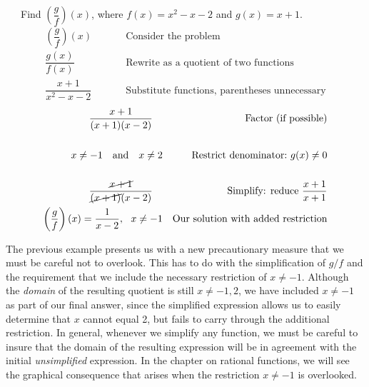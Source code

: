\begin{example}~~~Find $\left(\dfrac{g}{f}\right)(x)$, where $f(x) = x^2 - x - 2$ and $g(x) = x + 1$.
 \begin{eqnarray*}
    \left(\dfrac{g}{f}\right)(x)~~~~~~~~ &  & \text{Consider the problem} \\
		\dfrac{g(x)}{f(x)}~~~~~~~~~ &  & \text{Rewrite~as~a~quotient~of~two~functions}\\
    \dfrac{x + 1}{x^2 - x - 2}~~~~~  &  & \text{Substitute~functions,~parentheses~unnecessary}
\end{eqnarray*}
 \begin{eqnarray*}
  	 \dfrac{x+1}{(x+1)(x-2)}~~~&  & \text{Factor (if possible)}\\
  & & \\ 
		x \neq -1 ~~\text{~and~}~~ x \neq 2 &  & \text{Restrict~denominator:~}g(x)\neq 0\\
  & & \\ 
	\dfrac{\cancel{x + 1}}{\cancel{(x+1)}(x-2)}~~~  & & \text{Simplify: reduce $\dfrac{x+1}{x+1}$}\\
	\left(\dfrac{g}{f}\right)(x)=\dfrac{1}{x-2}, ~~ x \neq -1  & & \text{Our solution with added restriction}
	\end{eqnarray*}
\end{example}
		
The previous example presents us with a new precautionary measure that we must be careful not to overlook.  This has to do with the simplification of $g/f$ and the requirement that we include the necessary restriction of $x\neq -1$.  Although the \textit{domain} of the resulting quotient is still $x\neq -1,2$, we have included $x\neq -1$ as part of our final answer, since the simplified expression allows us to easily determine that $x$ cannot equal 2, but fails to carry through the additional restriction.\pp
In general, whenever we simplify any function, we must be careful to insure that the domain of the resulting expression will be in agreement with the initial \textit{unsimplified} expression.  In the chapter on rational functions, we will see the graphical consequence that arises when the restriction $x\neq -1$ is overlooked.\pp
 
